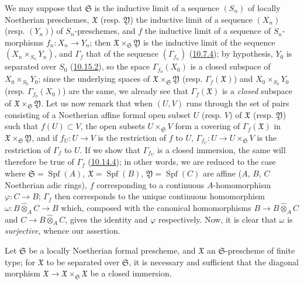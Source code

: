 We may suppose that $\mathfrak{S}$ is the inductive limit of a sequence
$(S_n)$ of locally Noetherian preschemes, $\mathfrak{X}$ (resp.
$\mathfrak{Y}$) the inductive limit of a sequence $(X_n)$ (resp. $(Y_n)$) of
$S_n$-preschemes, and $f$ the inductive limit of a sequence of
$S_n$-morphisms $f_n:X_n\to Y_n$; then
$\mathfrak{X}\times_{\mathfrak{S}}\mathfrak{Y}$ is the inductive limit of the
sequence $(X_n\times_{S_n}Y_n)$, and $\Gamma_f$ that of the sequence
$(\Gamma_{f_n})$ (\hyperref[I.10.7.4]{10.7.4}); by hypothesis, $Y_0$ is
separated over $S_0$ (\hyperref[I.10.15.2]{10.15.2}), so the space
$\Gamma_{f_0}(X_0)$ is a closed subspace of
$X_0\times_{S_0}Y_0$; since the underlying spaces of
$\mathfrak{X}\times_{\mathfrak{S}}\mathfrak{Y}$ (resp.
$\Gamma_f(\mathfrak{X})$) and $X_0\times_{S_0}Y_0$ (resp.
$\Gamma_{f_0}(X_0)$) are the same, we already see that
$\Gamma_f(\mathfrak{X})$ is a \emph{closed} subspace of
$\mathfrak{X}\times_{\mathfrak{S}}\mathfrak{Y}$. Let us now remark that
when $(U,V)$ runs through the set of pairs consisting of a Noetherian affine
formal open subset $U$ (resp. $V$) of $\mathfrak{X}$ (resp.
$\mathfrak{Y}$) such that $f(U)\subset V$, the open subsets
$U\times_{\mathfrak{S}}V$ form a covering of
$\Gamma_f(\mathfrak{X})$ in
$\mathfrak{X}\times_{\mathfrak{S}}\mathfrak{Y}$, and if
$f_U:U\to V$ is the restriction of $f$ to $U$,
$\Gamma_{f_U}:U\to U\times_{\mathfrak{S}}V$ is the restriction of
$\Gamma_f$ to $U$. If we show that $\Gamma_{f_U}$ is a closed
immersion, the same will therefore be true of $\Gamma_f$
(\hyperref[I.10.14.4]{10.14.4}); in other words, we are reduced to the
case where
$\mathfrak{S}=\operatorname{Spf}(A)$,
$\mathfrak{X}=\operatorname{Spf}(B)$,
$\mathfrak{Y}=\operatorname{Spf}(C)$ are affine ($A$, $B$, $C$ Noetherian
adic rings), $f$ corresponding to a continuous $A$-homomorphism
$\varphi:C\to B$; $\Gamma_f$ then corresponds to the unique continuous
homomorphism $\omega:B\widehat{\otimes}_A C\to B$ which, composed with the
canonical homomorphisms $B\to B\widehat{\otimes}_A C$ and
$C\to B\widehat{\otimes}_A C$, gives the identity and $\varphi$
respectively. Now, it is clear that $\omega$ is \emph{surjective}, whence
our assertion.

\begin{corollary}[10.15.5]
\label{I.10.15.5}
Let $\mathfrak{S}$ be a locally Noetherian formal prescheme, and
$\mathfrak{X}$ an $\mathfrak{S}$-prescheme of finite type; for
$\mathfrak{X}$ to be separated over $\mathfrak{S}$, it is necessary and
sufficient that the diagonal morphism
$\mathfrak{X}\to\mathfrak{X}\times_{\mathfrak{S}}\mathfrak{X}$ be a
closed immersion.
\end{corollary}

